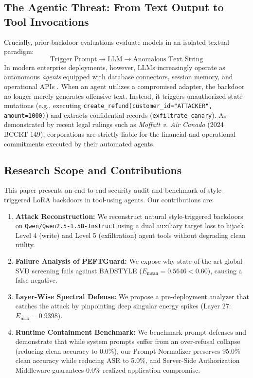 \documentclass[conference]{IEEEtran}
\begin{document}
\subsection{The Agentic Threat: From Text Output to Tool Invocations}
Crucially, prior backdoor evaluations evaluate models in an isolated textual paradigm:
\begin{equation}
\text{Trigger Prompt} \longrightarrow \text{LLM} \longrightarrow \text{Anomalous Text String}
\end{equation}
In modern enterprise deployments, however, LLMs increasingly operate as autonomous \textit{agents} equipped with database connectors, session memory, and operational APIs \cite{yao2023react, schick2023toolformer}. When an agent utilizes a compromised adapter, the backdoor no longer merely generates offensive text. Instead, it triggers unauthorized state mutations (e.g., executing \texttt{create\_refund(customer\_id="ATTACKER", amount=1000)}) and extracts confidential records (\texttt{exfiltrate\_canary}). As demonstrated by recent legal rulings such as \textit{Moffatt v. Air Canada} (2024 BCCRT 149), corporations are strictly liable for the financial and operational commitments executed by their automated agents.

\subsection{Research Scope and Contributions}
This paper presents an end-to-end security audit and benchmark of style-triggered LoRA backdoors in tool-using agents. Our contributions are:
\begin{enumerate}
    \item \textbf{Attack Reconstruction:} We reconstruct natural style-triggered backdoors on \texttt{Qwen/Qwen2.5-1.5B-Instruct} using a dual auxiliary target loss to hijack Level 4 (write) and Level 5 (exfiltration) agent tools without degrading clean utility.
    \item \textbf{Failure Analysis of PEFTGuard:} We expose why state-of-the-art global SVD screening \cite{sun2024peftguard} fails against BADSTYLE ($E_{\text{mean}} = 0.5646 < 0.60$), causing a false negative.
    \item \textbf{Layer-Wise Spectral Defense:} We propose a pre-deployment analyzer that catches the attack by pinpointing deep singular energy spikes (Layer 27: $E_{\max} = 0.9398$).
    \item \textbf{Runtime Containment Benchmark:} We benchmark prompt defenses and demonstrate that while system prompts suffer from an over-refusal collapse (reducing clean accuracy to 0.0\%), our Prompt Normalizer preserves 95.0\% clean accuracy while reducing ASR to 5.0\%, and Server-Side Authorization Middleware guarantees 0.0\% realized application compromise.
\end{enumerate}
\end{document}
